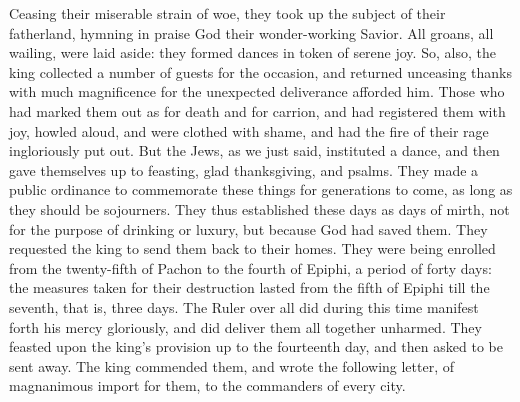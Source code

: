 {Ceasing their miserable strain of woe, they took up the subject of their fatherland, hymning in praise God their wonder-working Savior. All groans, all wailing, were laid aside: they formed dances in token of serene joy.
So, also, the king collected a number of guests for the occasion, and returned unceasing thanks with much magnificence for the unexpected deliverance afforded him.
Those who had marked them out as for death and for carrion, and had registered them with joy, howled aloud, and were clothed with shame, and had the fire of their rage ingloriously put out.
But the Jews, as we just said, instituted a dance, and then gave themselves up to feasting, glad thanksgiving, and psalms.
They made a public ordinance to commemorate these things for generations to come, as long as they should be sojourners. They thus established these days as days of mirth, not for the purpose of drinking or luxury, but because God had saved them.
They requested the king to send them back to their homes.
They were being enrolled from the twenty-fifth of Pachon to the fourth of Epiphi, a period of forty days: the measures taken for their destruction lasted from the fifth of Epiphi till the seventh, that is, three days.
The Ruler over all did during this time manifest forth his mercy gloriously, and did deliver them all together unharmed.
They feasted upon the king’s provision up to the fourteenth day, and then asked to be sent away.
The king commended them, and wrote the following letter, of magnanimous import for them, to the commanders of every city.

}
